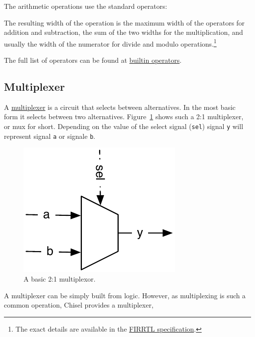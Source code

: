 \documentclass[%
    10pt, %
    headinclude, footexclude,
    openright, %
    notitlepage,
    cleardoubleempty,
    headsepline,
    pointlessnumbers,
    bibtotoc, idxtotoc,
    ]{scrbook}
\newcommand{\code}[1]{{\small{\texttt{#1}}}}
\newcommand{\scale}{0.7}
\newcommand{\myref}[2]{\href{#1}{#2}}
\begin{document}


\noindent The arithmetic operations use the standard operators:



\noindent The resulting width of the operation is the maximum width of the operators for
addition and subtraction, the sum of the two widths for the multiplication, and usually
the width of the numerator for divide and modulo operations.\footnote{The exact
details are available in the \myref{https://github.com/freechipsproject/firrtl/blob/master/spec/spec.pdf}{FIRRTL specification}.}



The full list of operators can be found at
\myref{https://github.com/freechipsproject/chisel3/wiki/Builtin-Operators}{builtin operators}.

\subsection{Multiplexer}

A \myref{https://en.wikipedia.org/wiki/Multiplexer}{multiplexer} is a circuit that selects between alternatives.
In the most basic form it selects between two alternatives. Figure~\ref{fig:mux} shows
such a 2:1 multiplexer, or mux for short. Depending on the value of the
select signal (\code{sel}) signal \code{y} will represent signal \code{a} or
signale \code{b}.

\begin{figure}
  \centering
  \includegraphics[scale=\scale]{figures/mux}
  \caption{A basic 2:1 multiplexor.}
  \label{fig:mux}
\end{figure}

A multiplexer can be simply built from logic.
However, as multiplexing  is such a common operation, Chisel provides a multiplexer,
\end{document}
